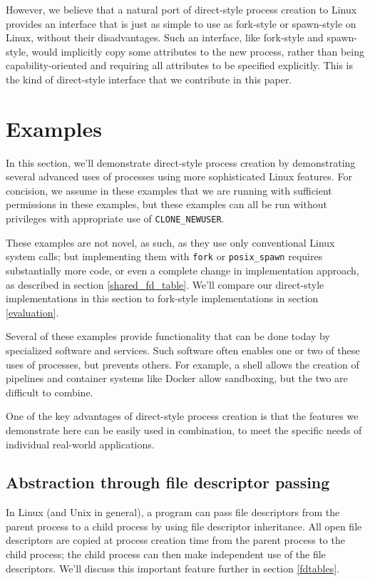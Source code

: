 \documentclass[letterpaper,twocolumn,10pt]{article}
\begin{document}
However, we believe that a natural port of direct-style process creation to Linux
provides an interface that is just as simple to use as fork-style or spawn-style on Linux,
without their disadvantages.
Such an interface, like fork-style and spawn-style,
would implicitly copy some attributes to the new process,
rather than being capability-oriented and requiring all attributes to be specified explicitly.
This is the kind of direct-style interface that we contribute in this paper.
\section{Examples}\label{examples}
In this section,
we'll demonstrate direct-style process creation
by demonstrating several advanced uses of processes
using more sophisticated Linux features.
For concision, we assume in these examples that we are running with sufficient permissions in these examples,
but these examples can all be run without privileges with appropriate use of \verb|CLONE_NEWUSER|.

These examples are not novel, as such, as they use only conventional Linux system calls;
but implementing them with \texttt{fork} or \verb|posix_spawn| requires substantially more code,
or even a complete change in implementation approach,
as described in section \ref{shared_fd_table}.
We'll compare our direct-style implementations in this section
to fork-style implementations
in section \ref{evaluation}.

Several of these examples provide functionality that can be done today by specialized software and services.
Such software often enables one or two of these uses of processes, but prevents others.
For example, a shell allows the creation of pipelines and container systems like Docker allow sandboxing,
but the two are difficult to combine.\cite{docker_pipe}

One of the key advantages of direct-style process creation is that the features we demonstrate here
can be easily used in combination,
to meet the specific needs of individual real-world applications.
\subsection{Abstraction through file descriptor passing}\label{fd_abstraction}
In Linux (and Unix in general),
a program can pass file descriptors from the parent process to a child process
by using file descriptor inheritance.
All open file descriptors are copied at process creation time from the parent process to the child process;
the child process can then make independent use of the file descriptors.
We'll discuss this important feature further in section \ref{fdtables}.
\end{document}
